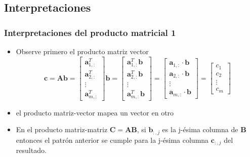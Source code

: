 \documentclass{beamer}
\begin{document}
\subsection{Interpretaciones}
\begin{frame}
\frametitle{Interpretaciones del producto matricial 1}
\begin{itemize}
\item Observe primero el producto matriz vector 
\begin{equation*}
\boldsymbol{c} =\boldsymbol{Ab}=\begin{bmatrix} \boldsymbol{a}_{1,:}^T  \\ \boldsymbol{a}_{2,:}^T  \\ \vdots \\ \boldsymbol{a}_{m,:}^T   \end{bmatrix} \boldsymbol{b} = \begin{bmatrix} \boldsymbol{a}_{1,:}^T \boldsymbol{b}  \\ \boldsymbol{a}_{2,:}^T \boldsymbol{b} \\ \vdots \\ \boldsymbol{a}_{m,:}^T \boldsymbol{b}  \end{bmatrix}= \begin{bmatrix} \boldsymbol{a}_{1,:} \cdot \boldsymbol{b}  \\ \boldsymbol{a}_{2,:} \cdot \boldsymbol{b} \\ \vdots \\ \boldsymbol{a}_{m,:} \cdot \boldsymbol{b}  \end{bmatrix} = \begin{bmatrix} c_{1}  \\ c_{2}  \\ \vdots \\ c_{m}   \end{bmatrix}
\end{equation*}
\item el producto matriz-vector mapea un vector en otro

\item En el producto matriz-matriz $\boldsymbol{C}=\boldsymbol{A}\boldsymbol{B}$, si $\boldsymbol{b}_{:,j}$ es la j-ésima columna de $\boldsymbol{B}$ entonces el patrón anterior se cumple para la j-ésima columna $\boldsymbol{c}_{:,j}$ del resultado.
\end{itemize}
\end{frame}
\end{document}
